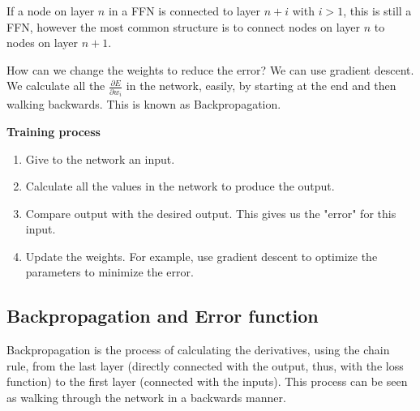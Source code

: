 \documentclass[main]{subfiles}
\begin{document}
If a node on layer $n$ in a FFN is connected to layer $n+i$ with $i > 1$, this is still a FFN, however the most common structure is to connect nodes on layer $n$ to nodes on layer $n+1$.


How can we change the weights to reduce the error?
We can use gradient descent.
We calculate all the $\frac{\partial E}{\partial w_i}$ in the network, easily, by starting at the end and then walking backwards. This is known as Backpropagation.

\textbf{Training process}
\begin{enumerate}
\item Give to the network an input.
\item Calculate all the values in the network to produce the output.
\item Compare output with the desired output.
This gives us the "error" for this input.
\item Update the weights.
For example, use gradient descent to optimize the parameters to minimize the error.
\end{enumerate}


\subsection{Backpropagation and Error function}
Backpropagation is the process of calculating the derivatives, using the chain rule, from the last layer (directly connected with the output, thus, with the loss function) to the first layer (connected with the inputs).
This process can be seen as walking through the network in a backwards manner.
\end{document}
